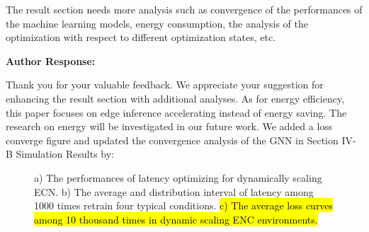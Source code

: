 \documentclass{ar2rc}
\begin{document}
\begin{tcolorbox}[
   title={Reviewer 3: Comment 7},
   colback=gray!10,%
   colframe=black,%
   width=\linewidth,%
   arc=1mm, auto outer arc,
   boxrule=0.5pt,
]
The result section needs more analysis such as convergence of the performances of the machine learning models, energy consumption, the analysis of the optimization with respect to different optimization states, etc.
\end{tcolorbox}

\textbf{Author Response:}


\noindent Thank you for your valuable feedback. We appreciate your suggestion for enhancing the result section with additional analyses. As for energy efficiency, this paper focuses on edge inference accelerating instead of energy saving. The research on energy will be investigated in our future work. We added a loss converge figure and updated the convergence analysis of the GNN in Section IV-B Simulation Results by:

\setcounter{figure}{8} %
\begin{figure*}[ht]
   \hfill %


   \caption{a) The performances of latency optimizing for dynamically scaling ECN. b) The average and distribution interval of latency among 1000 times retrain four typical conditions. \hl{c) The average loss curves among 10 thousand times in dynamic scaling ENC environments.}}\label{fig: latency and loss convergence}
\end{figure*}
\end{document}
